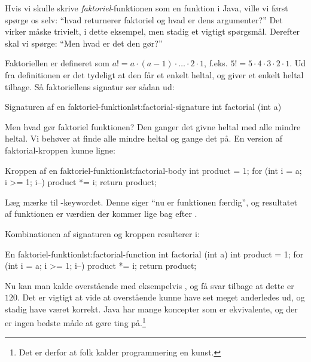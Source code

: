         Hvis vi skulle skrive \emph{faktoriel}-funktionen som en
        funktion i Java, ville vi først spørge os selv: ``hvad
        returnerer faktoriel og hvad er dens argumenter?'' Det virker
        måske trivielt, i dette eksempel, men stadig et vigtigt
        spørgsmål. Derefter skal vi spørge: ``Men hvad er det den
        gør?''

        Faktoriellen er defineret som \(a! = a \cdot (a-1) \cdot \dots
        \cdot 2 \cdot 1\), f.eks. \(5! = 5 \cdot 4 \cdot 3 \cdot 2
        \cdot 1\). Ud fra definitionen er det tydeligt at den får et
        enkelt heltal, og giver et enkelt heltal tilbage. Så
        faktoriellens signatur ser sådan ud:

		\begin{JavaCode}{Signaturen af en faktoriel-funktion}{lst:factorial-signature}
			int factorial (int a)
		\end{JavaCode}

		Men hvad gør faktoriel funktionen? Den ganger det givne heltal med alle mindre
		heltal. Vi behøver at finde alle mindre heltal og gange det på. En version
		af faktorial-kroppen kunne ligne:

		\begin{JavaCode}{Kroppen af en faktoriel-funktion}{lst:factorial-body}
			int product = 1;
			for (int i = a; i >= 1; i--)
				product *= i;
			return product;
		\end{JavaCode}

        Læg mærke til -keywordet. Denne siger ``nu
        er funktionen færdig'', og resultatet af funktionen er værdien
        der kommer lige bag efter .

		Kombinationen af signaturen og kroppen resulterer i:

		\begin{JavaCode}{En faktoriel-funktion}{lst:factorial-function}
			int factorial (int a) {
				int product = 1;
				for (int i = a; i >= 1; i--)
					product *= i;
				return product;
			}
		\end{JavaCode}

        Nu kan man kalde overstående med eksempelvis
        , og få svar tilbage at dette er
        \(120\). Det er vigtigt at vide at overstående kunne have set
        meget anderledes ud, og stadig have været korrekt. Java har
        mange koncepter som er ekvivalente, og der er ingen bedste
        måde at gøre ting på.\footnote{Det er derfor at folk kalder
        programmering en kunst.}


